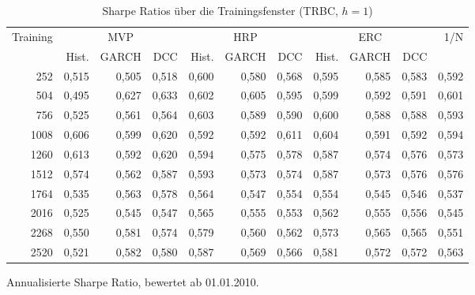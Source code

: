 \begin{table}[htbp]
  \centering
  \footnotesize
  \begin{tabular}{rrrrrrrrrrr}
    \toprule
    Training & \multicolumn{3}{c}{MVP} & \multicolumn{3}{c}{HRP} & \multicolumn{3}{c}{ERC} & 1/N \\
    \cmidrule(lr){2-4}\cmidrule(lr){5-7}\cmidrule(lr){8-10}
     & Hist. & GARCH & DCC & Hist. & GARCH & DCC & Hist. & GARCH & DCC & \\
    \midrule
    252 & 0,515 & 0,505 & 0,518 & 0,600 & 0,580 & 0,568 & 0,595 & 0,585 & 0,583 & 0,592 \\
    504 & 0,495 & 0,627 & 0,633 & 0,602 & 0,605 & 0,595 & 0,599 & 0,592 & 0,591 & 0,601 \\
    756 & 0,525 & 0,561 & 0,564 & 0,603 & 0,589 & 0,590 & 0,600 & 0,588 & 0,588 & 0,593 \\
    1008 & 0,606 & 0,599 & 0,620 & 0,592 & 0,592 & 0,611 & 0,604 & 0,591 & 0,592 & 0,594 \\
    1260 & 0,613 & 0,592 & 0,620 & 0,594 & 0,575 & 0,578 & 0,587 & 0,574 & 0,576 & 0,573 \\
    1512 & 0,574 & 0,562 & 0,587 & 0,593 & 0,573 & 0,574 & 0,587 & 0,573 & 0,576 & 0,576 \\
    1764 & 0,535 & 0,563 & 0,578 & 0,564 & 0,547 & 0,554 & 0,554 & 0,545 & 0,546 & 0,537 \\
    2016 & 0,525 & 0,545 & 0,547 & 0,565 & 0,555 & 0,553 & 0,562 & 0,555 & 0,556 & 0,545 \\
    2268 & 0,550 & 0,581 & 0,574 & 0,579 & 0,560 & 0,562 & 0,573 & 0,565 & 0,565 & 0,551 \\
    2520 & 0,521 & 0,582 & 0,580 & 0,587 & 0,569 & 0,566 & 0,581 & 0,572 & 0,572 & 0,563 \\
    \bottomrule
  \end{tabular}
  \caption{Sharpe Ratios über die Trainingsfenster (TRBC, $h=1$)}
  \label{tab:sharpe_train}
  \begin{minipage}{\linewidth}\vspace{0.4em}\centering\footnotesize
  Annualisierte Sharpe Ratio, bewertet ab 01.01.2010.
  \end{minipage}
\end{table}
